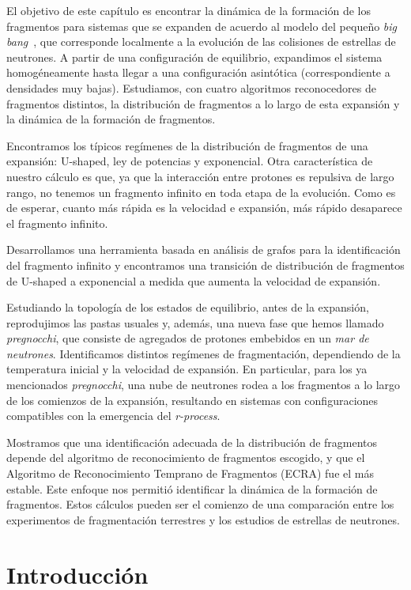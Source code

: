 El objetivo de este capítulo es encontrar la dinámica de la formación de los fragmentos para sistemas que se expanden de acuerdo al modelo del pequeño \emph{big bang}~\cite{dorso_onset_1996}, que corresponde localmente a la evolución de las colisiones de estrellas de neutrones.
A partir de una configuración de equilibrio, expandimos el sistema homogéneamente hasta llegar a una configuración asintótica (correspondiente a densidades muy bajas).
Estudiamos, con cuatro algoritmos reconocedores de fragmentos distintos, la distribución de fragmentos a lo largo de esta expansión y la dinámica de la formación de fragmentos.

Encontramos los típicos regímenes de la distribución de fragmentos de una expansión: U-shaped, ley de potencias y exponencial.
Otra característica de nuestro cálculo es que, ya que la interacción entre protones es repulsiva de largo rango, no tenemos un fragmento infinito en toda etapa de la evolución.
Como es de esperar, cuanto más rápida es la velocidad e expansión, más rápido desaparece el fragmento infinito.

Desarrollamos una herramienta basada en análisis de grafos para la identificación del fragmento infinito y encontramos una transición de distribución de fragmentos de U-shaped a exponencial a medida que aumenta la velocidad de expansión.

Estudiando la topología de los estados de equilibrio, antes de la expansión, reprodujimos las pastas usuales y, además, una nueva fase que hemos llamado \emph{pregnocchi}, que consiste de agregados de protones embebidos en un  \emph{mar de neutrones}.
Identificamos distintos regímenes de fragmentación, dependiendo de la temperatura inicial y la velocidad de expansión.
En particular, para los ya mencionados \emph{pregnocchi}, una nube de neutrones rodea a los fragmentos a lo largo de los comienzos de la expansión, resultando en sistemas con configuraciones compatibles con la emergencia del \emph{r-process}.

Mostramos que una identificación adecuada de la distribución de fragmentos depende del algoritmo de reconocimiento de fragmentos escogido, y que el Algoritmo de Reconocimiento Temprano de Fragmentos (ECRA) fue el más estable.
Este enfoque nos permitió identificar la dinámica de la formación de fragmentos.
Estos cálculos pueden ser el comienzo de una comparación entre los experimentos de fragmentación terrestres y los estudios de estrellas de neutrones.


\section{Introducción}

